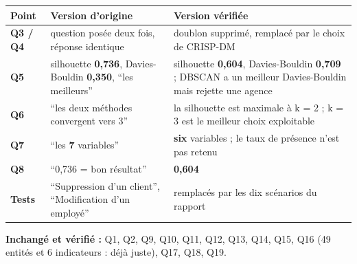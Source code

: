 \documentclass[a4paper,11pt]{article}
\begin{document}
\noindent\begin{tabularx}{\textwidth}{|>{\bfseries}L{1.6cm}|L{5.4cm}|X|}
\hline
\textmd{\textbf{Point}} & \textbf{Version d'origine} & \textbf{Version vérifiée}\\
\hline
Q3 / Q4 & question posée deux fois, réponse identique & doublon supprimé, remplacé par le choix de CRISP-DM\\
\hline
Q5 & silhouette \textbf{0,736}, Davies-Bouldin \textbf{0,350}, \enquote{les meilleurs} & silhouette \textbf{0,604}, Davies-Bouldin \textbf{0,709} ; DBSCAN a un meilleur Davies-Bouldin mais rejette une agence\\
\hline
Q6 & \enquote{les deux méthodes convergent vers 3} & la silhouette est maximale à k = 2 ; k = 3 est le meilleur choix exploitable\\
\hline
Q7 & \enquote{les \textbf{7} variables} & \textbf{six} variables ; le taux de présence n'est pas retenu\\
\hline
Q8 & \enquote{0,736 = bon résultat} & \textbf{0,604}\\
\hline
Tests & \enquote{Suppression d'un client}, \enquote{Modification d'un employé} & remplacés par les dix scénarios du rapport\\
\hline
\end{tabularx}

\vspace{0.8em}
\noindent\textbf{Inchangé et vérifié :} Q1, Q2, Q9, Q10, Q11, Q12, Q13, Q14,
Q15, Q16 (49 entités et 6 indicateurs : déjà juste), Q17, Q18, Q19.
\end{document}
